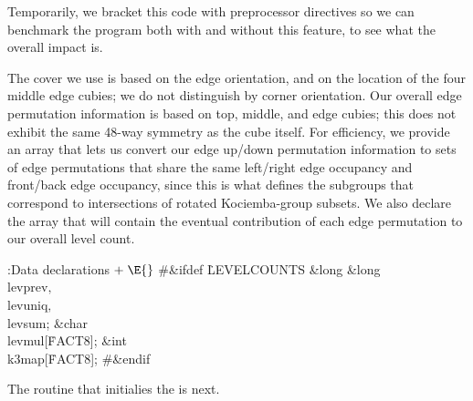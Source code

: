 Temporarily, we bracket this code with preprocessor directives
so we can benchmark the program both with and without this
feature, to see what the overall impact is.

The cover we use is based on the edge orientation, and on the
location of the four middle edge cubies; we do not distinguish
by corner orientation.  Our overall edge permutation information
is based on top, middle, and edge cubies; this does not
exhibit the same 48-way symmetry as the cube itself.  For
efficiency, we provide an array that lets us convert our
edge up/down permutation information to sets of edge permutations
that share the same left/right edge occupancy and front/back
edge occupancy, since this is what defines the subgroups that
correspond to intersections of rotated Kociemba-group
subsets.  We also declare the array that will contain the
eventual contribution of each edge permutation to our overall
level count.

\Y\B\4:Data declarations\X${}\mathrel+\E{}$\6
\8\#\&{ifdef} \.{LEVELCOUNTS}\6
\&{long} \&{long} \\{levprev}${},{}$ \\{levuniq}${},{}$ \\{levsum};\6
\&{char} \\{levmul}[\.{FACT8}];\6
\&{int} \\{k3map}[\.{FACT8}];\6
\8\#\&{endif}\par
\fi

The routine that initialies the  is next.


